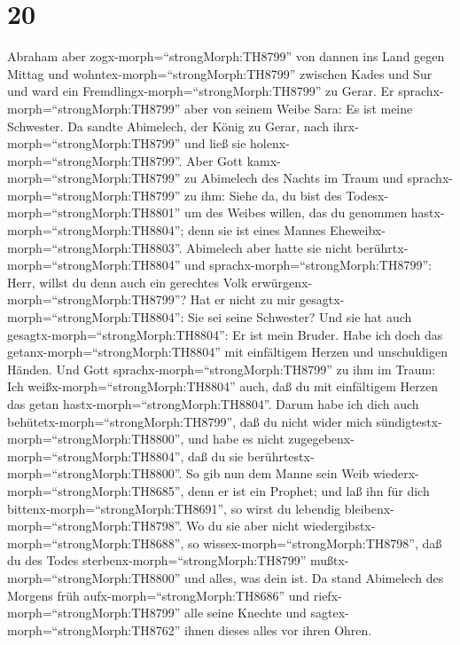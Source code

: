 \hypertarget{section-19}{%
\section{20}\label{section-19}}

 Abraham aber zogx-morph=``strongMorph:TH8799'' von dannen
ins Land gegen Mittag und wohntex-morph=``strongMorph:TH8799'' zwischen
Kades und Sur und ward ein Fremdlingx-morph=``strongMorph:TH8799'' zu
Gerar.  Er sprachx-morph=``strongMorph:TH8799'' aber von
seinem Weibe Sara: Es ist meine Schwester. Da sandte Abimelech, der
König zu Gerar, nach ihrx-morph=``strongMorph:TH8799'' und ließ sie
holenx-morph=``strongMorph:TH8799''.  Aber Gott
kamx-morph=``strongMorph:TH8799'' zu Abimelech des Nachts im Traum und
sprachx-morph=``strongMorph:TH8799'' zu ihm: Siehe da, du bist des
Todesx-morph=``strongMorph:TH8801'' um des Weibes willen, das du
genommen hastx-morph=``strongMorph:TH8804''; denn sie ist eines Mannes
Eheweibx-morph=``strongMorph:TH8803''.  Abimelech aber hatte
sie nicht berührtx-morph=``strongMorph:TH8804'' und
sprachx-morph=``strongMorph:TH8799'': Herr, willst du denn auch ein
gerechtes Volk erwürgenx-morph=``strongMorph:TH8799''?  Hat
er nicht zu mir gesagtx-morph=``strongMorph:TH8804'': Sie sei seine
Schwester? Und sie hat auch gesagtx-morph=``strongMorph:TH8804'': Er ist
mein Bruder. Habe ich doch das getanx-morph=``strongMorph:TH8804'' mit
einfältigem Herzen und unschuldigen Händen.  Und Gott
sprachx-morph=``strongMorph:TH8799'' zu ihm im Traum: Ich
weißx-morph=``strongMorph:TH8804'' auch, daß du mit einfältigem Herzen
das getan hastx-morph=``strongMorph:TH8804''. Darum habe ich dich auch
behütetx-morph=``strongMorph:TH8799'', daß du nicht wider mich
sündigtestx-morph=``strongMorph:TH8800'', und habe es nicht
zugegebenx-morph=``strongMorph:TH8804'', daß du sie
berührtestx-morph=``strongMorph:TH8800''.  So gib nun dem
Manne sein Weib wiederx-morph=``strongMorph:TH8685'', denn er ist ein
Prophet; und laß ihn für dich bittenx-morph=``strongMorph:TH8691'', so
wirst du lebendig bleibenx-morph=``strongMorph:TH8798''. Wo du sie aber
nicht wiedergibstx-morph=``strongMorph:TH8688'', so
wissex-morph=``strongMorph:TH8798'', daß du des Todes
sterbenx-morph=``strongMorph:TH8799'' mußtx-morph=``strongMorph:TH8800''
und alles, was dein ist.  Da stand Abimelech des Morgens
früh aufx-morph=``strongMorph:TH8686'' und
riefx-morph=``strongMorph:TH8799'' alle seine Knechte und
sagtex-morph=``strongMorph:TH8762'' ihnen dieses alles vor ihren Ohren.
